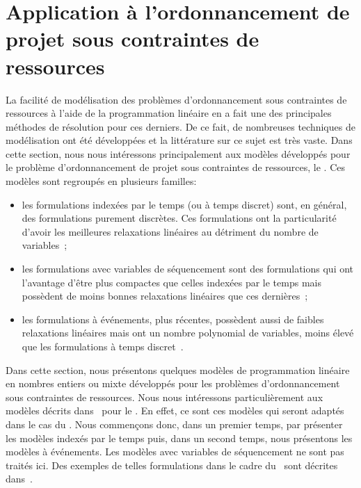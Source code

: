 \section[Application au RCPSP]{Application à l'ordonnancement de projet sous contraintes de
  ressources}   
\label{sec:PLNE_ordo_res}

La facilité de modélisation des problèmes d'ordonnancement sous
contraintes de ressources à l'aide de la programmation linéaire en a
fait une des principales méthodes de résolution pour ces derniers. De
ce fait, de nombreuses techniques de modélisation ont été développées
et la littérature sur ce sujet est très vaste. Dans cette section,
nous nous intéressons principalement aux modèles développés pour le
problème d'ordonnancement de projet sous contraintes de ressources, le
\RCPSP. Ces modèles sont regroupés en plusieurs familles:
\begin{itemize}
\item les formulations indexées par le temps (ou à temps discret)
sont, en général, des formulations purement discrètes. Ces
formulations ont la particularité d'avoir les meilleures relaxations
linéaires au détriment du nombre de
variables~\cite{CAVT,ex_RCPSP_discret};
\item les formulations avec variables de séquencement sont des
formulations qui ont l'avantage d'être plus compactes que celles
indexées par le temps mais possèdent de moins bonnes relaxations
linéaires que ces dernières~\cite{AVT,AMR};
\item les formulations à événements, plus récentes, possèdent aussi de
faibles relaxations linéaires mais ont un nombre polynomial de
variables, moins élevé que  les formulations à temps
discret~\cite{modele_RCPSP}.
\end{itemize}

Dans cette section, nous présentons quelques modèles de
programmation linéaire en nombres entiers ou mixte développés pour les
problèmes d'ordonnancement sous contraintes de ressources. Nous nous
intéressons particulièrement aux modèles décrits
dans~\cite{modele_RCPSP} pour le \RCPSP. En effet, ce sont ces modèles
qui seront adaptés dans le cas du \CECSP. Nous commençons donc, dans
un premier temps, par présenter les modèles indexés par le temps puis,
dans un second temps, nous présentons les modèles à événements. Les
modèles avec variables de séquencement ne sont pas traités ici. Des
exemples de telles formulations dans le cadre du \RCPSP~sont décrites
dans~\cite{ADN}.

